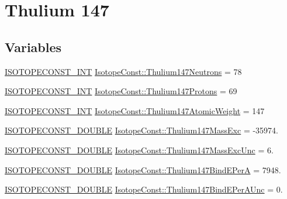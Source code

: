 \hypertarget{group___isotope_const-_thulium-_tm147}{}\section{Thulium 147}
\label{group___isotope_const-_thulium-_tm147}
\subsection*{Variables}
\begin{DoxyCompactItemize}
\item 
\mbox{\hyperlink{group___isotope_const-_macros_ga5f18360b3e99483a35c32d789e62621c}{I\+S\+O\+T\+O\+P\+E\+C\+O\+N\+S\+T\+\_\+\+I\+NT}} \mbox{\hyperlink{group___isotope_const-_thulium-_tm147_ga6c0214205f170598cf206676424fdd1c}{Isotope\+Const\+::\+Thulium147\+Neutrons}} = 78
\item 
\mbox{\hyperlink{group___isotope_const-_macros_ga5f18360b3e99483a35c32d789e62621c}{I\+S\+O\+T\+O\+P\+E\+C\+O\+N\+S\+T\+\_\+\+I\+NT}} \mbox{\hyperlink{group___isotope_const-_thulium-_tm147_ga0ef0bbae9bfd63fa3b27004b4f3f456a}{Isotope\+Const\+::\+Thulium147\+Protons}} = 69
\item 
\mbox{\hyperlink{group___isotope_const-_macros_ga5f18360b3e99483a35c32d789e62621c}{I\+S\+O\+T\+O\+P\+E\+C\+O\+N\+S\+T\+\_\+\+I\+NT}} \mbox{\hyperlink{group___isotope_const-_thulium-_tm147_ga0e75675329a7d2304995da9375376764}{Isotope\+Const\+::\+Thulium147\+Atomic\+Weight}} = 147
\item 
\mbox{\hyperlink{group___isotope_const-_macros_ga8f45a7272ce02c0b4c65c44636ed719a}{I\+S\+O\+T\+O\+P\+E\+C\+O\+N\+S\+T\+\_\+\+D\+O\+U\+B\+LE}} \mbox{\hyperlink{group___isotope_const-_thulium-_tm147_gacf6c85eb98052ac0b3c4ac95ce268471}{Isotope\+Const\+::\+Thulium147\+Mass\+Exc}} = -\/35974.
\item 
\mbox{\hyperlink{group___isotope_const-_macros_ga8f45a7272ce02c0b4c65c44636ed719a}{I\+S\+O\+T\+O\+P\+E\+C\+O\+N\+S\+T\+\_\+\+D\+O\+U\+B\+LE}} \mbox{\hyperlink{group___isotope_const-_thulium-_tm147_ga1e8aa7504b4655184e8a67d669b9402a}{Isotope\+Const\+::\+Thulium147\+Mass\+Exc\+Unc}} = 6.
\item 
\mbox{\hyperlink{group___isotope_const-_macros_ga8f45a7272ce02c0b4c65c44636ed719a}{I\+S\+O\+T\+O\+P\+E\+C\+O\+N\+S\+T\+\_\+\+D\+O\+U\+B\+LE}} \mbox{\hyperlink{group___isotope_const-_thulium-_tm147_ga8b6ec3c58d22320c60a7efa1deaac068}{Isotope\+Const\+::\+Thulium147\+Bind\+E\+PerA}} = 7948.
\item 
\mbox{\hyperlink{group___isotope_const-_macros_ga8f45a7272ce02c0b4c65c44636ed719a}{I\+S\+O\+T\+O\+P\+E\+C\+O\+N\+S\+T\+\_\+\+D\+O\+U\+B\+LE}} \mbox{\hyperlink{group___isotope_const-_thulium-_tm147_gafc1151aef176ac87cda04e63e80aaa14}{Isotope\+Const\+::\+Thulium147\+Bind\+E\+Per\+A\+Unc}} = 0.

\end{DoxyCompactItemize}
